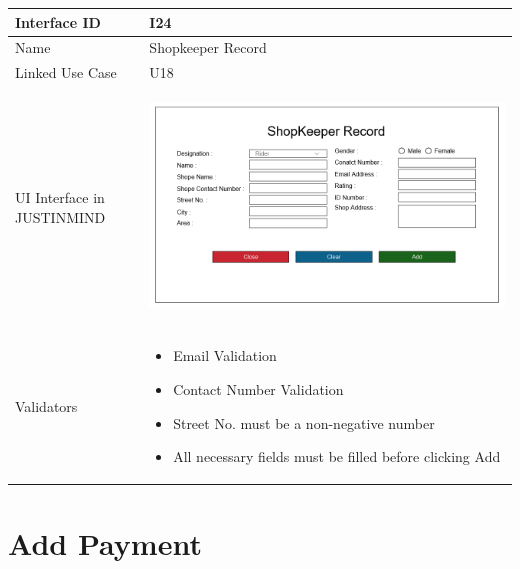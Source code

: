 \documentclass[12pt,a4paper]{report}
\begin{document}
\begin{tabular}{ | m{3cm} | m{12cm}| } \hline

Interface ID &  I24 \\\hline

Name  & Shopkeeper Record  \\ \hline

Linked Use Case & U18 \\ \hline

UI Interface in JUSTINMIND & \begin{center} \includegraphics[scale=0.3]{./UIs for Latex Reports/UI-025 Add ShopKeeper@1x.png}\end{center}  \\ \hline

Validators & 
\begin{itemize}
\item  Email Validation
\item Contact Number Validation
\item Street No. must be a non-negative number
\item All necessary fields must be filled before clicking Add
 

\end{itemize}
\\ \hline

\end{tabular} 
\section{Add Payment }
\end{document}
